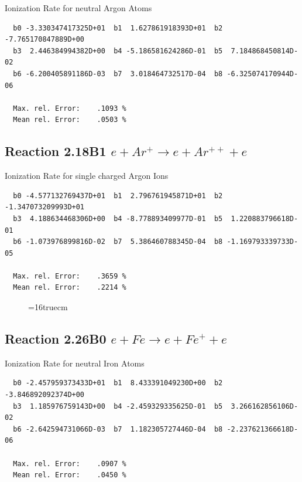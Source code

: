 \documentclass[12pt,dvips]{article}
\begin{document}
  Ionization Rate for neutral Argon Atoms

\begin{small}\begin{verbatim}
  b0 -3.330347417325D+01  b1  1.627861918393D+01  b2 -7.765170847889D+00
  b3  2.446384994382D+00  b4 -5.186581624286D-01  b5  7.184868450814D-02
  b6 -6.200405891186D-03  b7  3.018464732517D-04  b8 -6.325074170944D-06

  Max. rel. Error:    .1093 %
  Mean rel. Error:    .0503 %

\end{verbatim}\end{small}



\subsection{
Reaction 2.18B1   $e + Ar^+ \rightarrow e + Ar^{++} + e$
}

  Ionization Rate for single charged Argon Ions

\begin{small}\begin{verbatim}
  b0 -4.577132769437D+01  b1  2.796761945871D+01  b2 -1.347073209993D+01
  b3  4.188634468306D+00  b4 -8.778893409977D-01  b5  1.220883796618D-01
  b6 -1.073976899816D-02  b7  5.386460788345D-04  b8 -1.169793339733D-05

  Max. rel. Error:    .3659 %
  Mean rel. Error:    .2214 %

\end{verbatim}\end{small}


\begin{figure} \label{2.18B}
\epsfxsize=16truecm
\end{figure}
\newpage



\subsection{
Reaction 2.26B0   $e + Fe  \rightarrow e + Fe^+  + e$
}

  Ionization Rate for neutral Iron Atoms

\begin{small}\begin{verbatim}
  b0 -2.457959373433D+01  b1  8.433391049230D+00  b2 -3.846892092374D+00
  b3  1.185976759143D+00  b4 -2.459329335625D-01  b5  3.266162856106D-02
  b6 -2.642594731066D-03  b7  1.182305727446D-04  b8 -2.237621366618D-06

  Max. rel. Error:    .0907 %
  Mean rel. Error:    .0450 %

\end{verbatim}\end{small}
\end{document}
